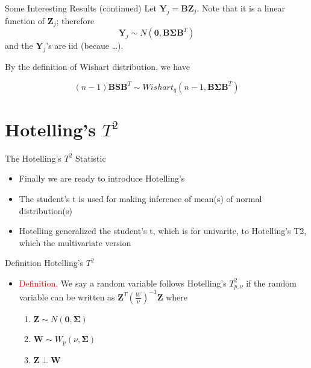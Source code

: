 \documentclass[
  ignorenonframetext,
]{beamer}
\providecommand{\tightlist}{%
  \setlength{\itemsep}{0pt}\setlength{\parskip}{0pt}}
\begin{document}
\begin{frame}{Some Interesting Results (continued)}
\protect\hypertarget{some-interesting-results-continued-1}{}
Let \(\mathbf Y_j=\mathbf B \mathbf Z_j\). Note that it is a linear
function of \(\mathbf Z_j\); therefore
\[\mathbf Y_j\sim N(\mathbf 0, \mathbf B \boldsymbol \Sigma \mathbf B^T)\]
and the \(\mathbf Y_j\)'s are iid (becaue \ldots).

By the definition of Wishart distribution, we have

\[(n-1)\mathbf B \mathbf S \mathbf B^T\sim Wishart_q(n-1, \mathbf B \boldsymbol \Sigma \mathbf B^T)\]
\end{frame}

\hypertarget{hotellings-t2}{%
\section{\texorpdfstring{Hotelling's
\(T^2\)}{Hotelling's T\^{}2}}\label{hotellings-t2}}

\begin{frame}{The Hotelling's \(T^2\) Statistic}
\protect\hypertarget{the-hotellings-t2-statistic}{}
\begin{itemize}
\item
  Finally we are ready to introduce Hotelling's
\item
  The student's t is used for making inference of mean(s) of normal
  distribution(s)
\item
  Hotelling generalized the student's t, which is for univarite, to
  Hotelling's T2, which the multivariate version
\end{itemize}
\end{frame}

\begin{frame}{Definition Hotelling's \(T^2\)}
\protect\hypertarget{definition-hotellings-t2}{}
\begin{itemize}
\tightlist
\item
  \textcolor{red}{Definition. }We say a random variable follows
  Hotelling's \(T_{p,\nu}^2\) if the random variable can be written as
  \(\mathbf Z^T\left(\frac{W}{\nu}\right)^{-1}\mathbf Z\) where

  \begin{enumerate}
  \tightlist
  \item
    \(\mathbf Z\sim N(\mathbf 0, \boldsymbol\Sigma)\)
  \item
    \(\mathbf W \sim W_p(\nu, \boldsymbol\Sigma)\)
  \item
    \(\mathbf Z \perp \mathbf W\)
  \end{enumerate}
\end{itemize}
\end{frame}
\end{document}
